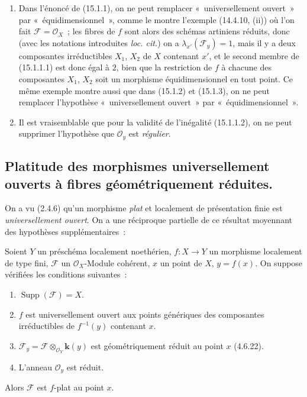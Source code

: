 \begin{remarks}[15.1.4]
\label{IV.15.1.4-fr}
\begin{enumerate}[label=(\roman*)]
  \item Dans l'énoncé de (15.1.1), on ne peut remplacer «~universellement
  ouvert~» par «~équidimensionnel~», comme le montre l'exemple (14.4.10, (ii)) où
  l'on fait $\mathcal F=\mathcal O_X$~; les fibres de $f$ sont alors des schémas
  artiniens réduits, donc (avec les notations introduites \emph{loc. cit.}) on a
  $\lambda_{x'}(\mathcal F_y)=1$, mais il y a deux composantes irréductibles
  $X_1$, $X_2$ de $X$ contenant $x'$, et le second membre de (15.1.1.1) est donc
  égal à $2$, bien que la restriction de $f$ à chacune des composantes $X_1$,
  $X_2$ soit un morphisme équidimensionnel en tout point. Ce même exemple montre
  aussi que dans (15.1.2) et (15.1.3), on ne peut remplacer l'hypothèse
  «~universellement ouvert~» par «~équidimensionnel~».
  \item Il est vraisemblable que pour la validité de l'inégalité (15.1.1.2), on
  ne peut supprimer l'hypothèse que $\mathcal O_y$ est \emph{régulier}.
\end{enumerate}
\end{remarks}

\subsection{Platitude des morphismes universellement ouverts à fibres géométriquement réduites.}
\label{subsection:IV.15.2-fr}

\begin{env}[15.2.1]
\label{IV.15.2.1-fr}
On a vu (2.4.6) qu'un morphisme \emph{plat} et localement de présentation finie
est \emph{universellement ouvert}. On a une réciproque partielle de ce résultat
moyennant des hypothèses supplémentaires~:
\end{env}

\begin{theorem}[15.2.2]
\label{IV.15.2.2-fr}
Soient $Y$ un préschéma localement noethérien, $f:X\to Y$ un morphisme localement
de type fini, $\mathcal F$ un $\mathcal O_X$-Module cohérent, $x$ un point de
$X$, $y=f(x)$. On suppose vérifiées les conditions suivantes~:
\begin{enumerate}[label=\textup{(\roman*)}]
  \item $\operatorname{Supp}(\mathcal F)=X$.
  \item $f$ est universellement ouvert aux points génériques des composantes
  irréductibles de $f^{-1}(y)$ contenant $x$.
  \item $\mathcal F_y=\mathcal F\otimes_{\mathcal O_Y}\boldsymbol{k}(y)$ est
  géométriquement réduit au point $x$ \textup{(4.6.22)}.
  \item L'anneau $\mathcal O_y$ est réduit.
\end{enumerate}

Alors $\mathcal F$ est $f$-plat au point $x$.
\end{theorem}

